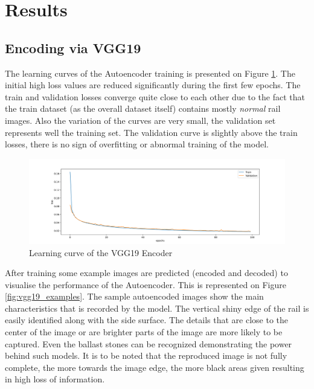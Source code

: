 \section{Results} \label{results}
\subsection{Encoding via VGG19}
The learning curves of the Autoencoder training is presented on Figure \ref{fig:vgg19_learning_curve}.
The initial high loss values are reduced significantly during the first few epochs.
The train and validation losses converge quite close to each other due to the fact that
the train dataset (as the overall dataset itself) contains mostly \emph{normal} rail images.
Also the variation of the curves are very small, the validation set represents well the training set.
The validation curve is slightly above the train losses, there is no sign of overfitting or abnormal
training of the model.

\begin{figure}[!ht]
    \centering
    \includegraphics[width=\textwidth,trim={0 0 0 1cm},clip]{./results/vgg19_vgg19/20230510_172958_results.png}
    \caption{Learning curve of the VGG19 Encoder}
    \label{fig:vgg19_learning_curve}
\end{figure}

After training some example images are predicted (encoded and decoded) to visualise the performance
of the Autoencoder.
This is represented on Figure \ref{fig:vgg19_examples}.
The sample autoencoded images show the main characteristics that is recorded by the model.
The vertical shiny edge of the rail is easily identified along with the side surface.
The details that are close to the center of the image or are brighter parts of the image are
more likely to be captured.
Even the ballast stones can be recognized demonstrating the power behind such models.
It is to be noted that the reproduced image is not fully complete,
the more towards the image edge, the more black areas given resulting in high loss of information.

